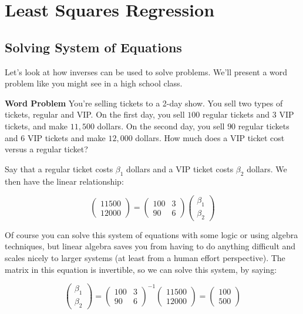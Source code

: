 \documentclass{amsbook}
\begin{document}
\section{Least Squares Regression}

\subsection{Solving System of Equations}

Let's look at how inverses can be used to solve problems.  We'll present a word problem like you might see in a high school class.

\begin{tcolorbox}[title=Example,colback=blue!5]
  {\bfseries\Large Word Problem}
  You're selling tickets to a 2-day show.  You sell two types of tickets, regular and VIP.  On the first day, you sell $100$ regular tickets and $3$ VIP tickets, and make $11,500$ dollars.  On the second day, you sell $90$ regular tickets and $6$ VIP tickets and make $12,000$ dollars.  How much does a VIP ticket cost versus a regular ticket?

Say that a regular ticket costs $\beta_1$ dollars and a VIP ticket costs $\beta_2$ dollars.  We then have the linear relationship:

$$
\left(\begin{array}{c} 11500 \\ 12000 \end{array}\right)=\left(\begin{array}{cc} 100&3\\90&6\end{array}\right)\left(\begin{array}{c}\beta_1\\ \beta_2\end{array}\right)
$$

Of course you can solve this system of equations with some logic or using algebra techniques, but linear algebra saves you from having to do anything difficult and scales nicely to larger systems (at least from a human effort perspective).  The matrix in this equation is invertible, so we can solve this system, by saying:

$$
\left(\begin{array}{c}\beta_1\\ \beta_2\end{array}\right)=\left(\begin{array}{cc} 100&3\\90&6\end{array}\right)^{-1}\left(\begin{array}{c} 11500 \\ 12000 \end{array}\right)=\left(\begin{array}{c}100 \\500\end{array}\right)
$$
\end{tcolorbox}
\end{document}
